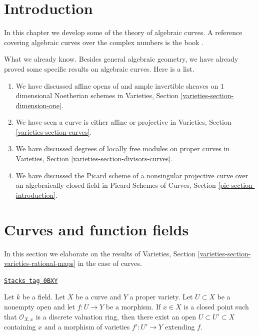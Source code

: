 \section{Introduction}
\label{curves-section-introduction}
In this chapter we develop some of the theory of algebraic curves.
A reference covering algebraic curves over the complex numbers is
the book \cite{ACGH}.

\medskip\noindent
What we already know. Besides general algebraic geometry, we
have already proved some specific results on algebraic curves.
Here is a list.
\begin{enumerate}
\item We have discussed affine opens of and ample invertible sheaves on
$1$ dimensional Noetherian schemes in
Varieties, Section \ref{varieties-section-dimension-one}.
\item We have seen a curve is either affine or projective
in Varieties, Section \ref{varieties-section-curves}.
\item We have discussed degrees of locally free modules on
proper curves in Varieties, Section \ref{varieties-section-divisors-curves}.
\item We have discussed the Picard scheme of a nonsingular projective
curve over an algebraically closed field in
Picard Schemes of Curves, Section \ref{pic-section-introduction}.
\end{enumerate}

\section{Curves and function fields}
\label{curves-section-curves-function-fields}
In this section we elaborate on the results of
Varieties, Section \ref{varieties-section-varieties-rational-maps}
in the case of curves.

\begin{lemma}
\label{curves-lemma-extend-over-dvr}
\href{https://stacks.math.columbia.edu/tag/0BXY}{\texttt{Stacks tag 0BXY}}

Let $k$ be a field. Let $X$ be a curve and $Y$ a proper variety.
Let $U \subset X$ be a nonempty open and let $f : U \to Y$ be a morphism.
If $x \in X$ is a closed point such that $\mathcal{O}_{X, x}$
is a discrete valuation ring, then there exist an open
$U \subset U' \subset X$ containing $x$ and a morphism of
varieties $f' : U' \to Y$ extending $f$.
\end{lemma}

